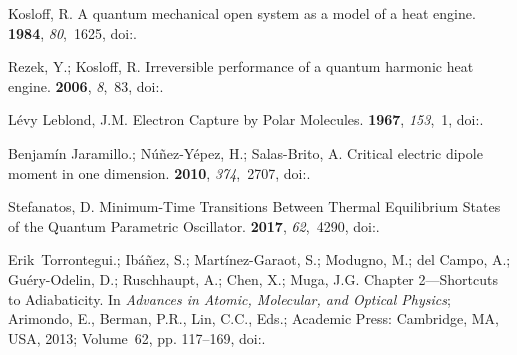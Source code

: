\documentclass[preprints,article,accept,moreauthors,pdftex]{Definitions/mdpi}
\begin{document}
\begin{thebibliography}{999}
Kosloff, R.
\newblock A quantum mechanical open system as a model of a heat engine.
 {\bf 1984}, {\em 80},~1625,
\newblock
  doi:{\href{https://doi.org/10.1063/1.446862}{}}.

Rezek, Y.; Kosloff, R.
\newblock Irreversible performance of a quantum harmonic heat engine.
 {\bf 2006}, {\em 8},~83,
\newblock
  doi:{\href{https://doi.org/10.1088/1367-2630/8/5/083}{}}.

L\'evy Leblond, J.M.
\newblock Electron Capture by Polar Molecules.
 {\bf 1967}, {\em 153},~1,
\newblock
  doi:{\href{https://doi.org/10.1103/PhysRev.153.1}{}}.

Benjamín Jaramillo.; Núñez-Yépez, H.; Salas-Brito, A.
\newblock Critical electric dipole moment in one dimension.
 {\bf 2010}, {\em 374},~2707,
\newblock
  doi:{\href{https://doi.org/10.1016/j.physleta.2010.04.058}{}}.

Stefanatos, D.
\newblock Minimum-Time Transitions Between Thermal Equilibrium States of the
  Quantum Parametric Oscillator.
 {\bf 2017}, {\em
  62},~4290,
\newblock
  doi:{\href{https://doi.org/10.1109/TAC.2017.2684083}{}}.

Erik~Torrontegui.; Ibáñez, S.; Martínez-Garaot, S.; Modugno, M.;
  {del Campo}, A.; Guéry-Odelin, D.; Ruschhaupt, A.; Chen, X.; Muga, J.G.
\newblock Chapter 2---Shortcuts to Adiabaticity. In {\em Advances in Atomic,
  Molecular, and Optical Physics}; Arimondo, E., Berman, P.R., Lin, C.C., Eds.;
  Academic Press: Cambridge, MA, USA, 2013; Volume~62, pp. 117--169,
\newblock
  doi:{\href{https://doi.org/10.1016/B978-0-12-408090-4.00002-5}{}}.


\end{thebibliography}
\end{document}
